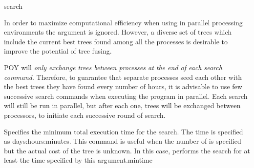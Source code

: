 \begin{command}{search}{}
\begin{arguments}


\begin{statement}
\setlength{\parindent}{0.5cm}
In order to maximize computational efficiency when using  
in parallel processing environments the 
argument is ignored. However, a diverse set of trees which
include the current best trees found among all the processes is
desirable to improve the potential of tree fusing.

\indent POY will \emph{only exchange trees between processes at the end
of each search command}. Therefore,
to guarantee that separate processes seed each other with the
best trees they have found every number of hours,
it is advisable to use few successive search commands
when executing the program in parallel. Each search will still
be run in parallel, but after each one, trees will be exchanged
between processors, to initiate each successive round of search.
\end{statement}

{Specifies the minimum total execution time for the search. The time is specified as
days:hours:minutes. This command is useful when
the number of  is specified but the actual cost of the
tree is unknown. In this case, \poy performs the search for at least the time
specified by this argument.}{mintime}




\end{arguments}
\end{command}
